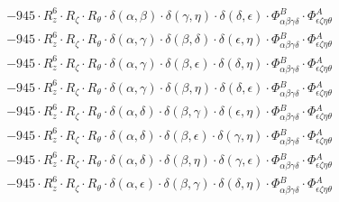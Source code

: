 \documentclass{article}
\begin{document}
\begin{equation}
\begin{array}{c}
 \\[0.2em] 		 - 945 \cdot R_{z}^{6} \cdot R_{\zeta{}} \cdot R_{\theta{}} \cdot \delta{}\left(\alpha{}, \beta{}\right) \cdot \delta{}\left(\gamma{}, \eta{}\right) \cdot \delta{}\left(\delta{}, \epsilon{}\right) \cdot \Phi{}^{B}_{\alpha{}\beta{}\gamma{}\delta{}} \cdot \Phi{}^{A}_{\epsilon{}\zeta{}\eta{}\theta{}} 
 \\[0.2em] 		 - 945 \cdot R_{z}^{6} \cdot R_{\zeta{}} \cdot R_{\theta{}} \cdot \delta{}\left(\alpha{}, \gamma{}\right) \cdot \delta{}\left(\beta{}, \delta{}\right) \cdot \delta{}\left(\epsilon{}, \eta{}\right) \cdot \Phi{}^{B}_{\alpha{}\beta{}\gamma{}\delta{}} \cdot \Phi{}^{A}_{\epsilon{}\zeta{}\eta{}\theta{}} 
 \\[0.2em] 		 - 945 \cdot R_{z}^{6} \cdot R_{\zeta{}} \cdot R_{\theta{}} \cdot \delta{}\left(\alpha{}, \gamma{}\right) \cdot \delta{}\left(\beta{}, \epsilon{}\right) \cdot \delta{}\left(\delta{}, \eta{}\right) \cdot \Phi{}^{B}_{\alpha{}\beta{}\gamma{}\delta{}} \cdot \Phi{}^{A}_{\epsilon{}\zeta{}\eta{}\theta{}} 
 \\[0.2em] 		 - 945 \cdot R_{z}^{6} \cdot R_{\zeta{}} \cdot R_{\theta{}} \cdot \delta{}\left(\alpha{}, \gamma{}\right) \cdot \delta{}\left(\beta{}, \eta{}\right) \cdot \delta{}\left(\delta{}, \epsilon{}\right) \cdot \Phi{}^{B}_{\alpha{}\beta{}\gamma{}\delta{}} \cdot \Phi{}^{A}_{\epsilon{}\zeta{}\eta{}\theta{}} 
 \\[0.2em] 		 - 945 \cdot R_{z}^{6} \cdot R_{\zeta{}} \cdot R_{\theta{}} \cdot \delta{}\left(\alpha{}, \delta{}\right) \cdot \delta{}\left(\beta{}, \gamma{}\right) \cdot \delta{}\left(\epsilon{}, \eta{}\right) \cdot \Phi{}^{B}_{\alpha{}\beta{}\gamma{}\delta{}} \cdot \Phi{}^{A}_{\epsilon{}\zeta{}\eta{}\theta{}} 
 \\[0.2em] 		 - 945 \cdot R_{z}^{6} \cdot R_{\zeta{}} \cdot R_{\theta{}} \cdot \delta{}\left(\alpha{}, \delta{}\right) \cdot \delta{}\left(\beta{}, \epsilon{}\right) \cdot \delta{}\left(\gamma{}, \eta{}\right) \cdot \Phi{}^{B}_{\alpha{}\beta{}\gamma{}\delta{}} \cdot \Phi{}^{A}_{\epsilon{}\zeta{}\eta{}\theta{}} 
 \\[0.2em] 		 - 945 \cdot R_{z}^{6} \cdot R_{\zeta{}} \cdot R_{\theta{}} \cdot \delta{}\left(\alpha{}, \delta{}\right) \cdot \delta{}\left(\beta{}, \eta{}\right) \cdot \delta{}\left(\gamma{}, \epsilon{}\right) \cdot \Phi{}^{B}_{\alpha{}\beta{}\gamma{}\delta{}} \cdot \Phi{}^{A}_{\epsilon{}\zeta{}\eta{}\theta{}} 
 \\[0.2em] 		 - 945 \cdot R_{z}^{6} \cdot R_{\zeta{}} \cdot R_{\theta{}} \cdot \delta{}\left(\alpha{}, \epsilon{}\right) \cdot \delta{}\left(\beta{}, \gamma{}\right) \cdot \delta{}\left(\delta{}, \eta{}\right) \cdot \Phi{}^{B}_{\alpha{}\beta{}\gamma{}\delta{}} \cdot \Phi{}^{A}_{\epsilon{}\zeta{}\eta{}\theta{}} 

\end{array}
\end{equation}
\end{document}
